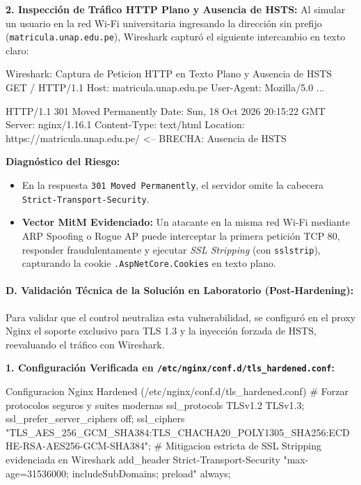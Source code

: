 \textbf{2. Inspección de Tráfico HTTP Plano y Ausencia de HSTS:} Al simular un usuario en la red Wi-Fi universitaria ingresando la dirección sin prefijo (\texttt{matricula.unap.edu.pe}), Wireshark capturó el siguiente intercambio en texto claro:

\begin{cmdbox}{Wireshark: Captura de Peticion HTTP en Texto Plano y Ausencia de HSTS}
GET / HTTP/1.1
Host: matricula.unap.edu.pe
User-Agent: Mozilla/5.0 ...

HTTP/1.1 301 Moved Permanently
Date: Sun, 18 Oct 2026 20:15:22 GMT
Server: nginx/1.16.1
Content-Type: text/html
Location: https://matricula.unap.edu.pe/
                                                         <-- BRECHA: Ausencia de HSTS
\end{cmdbox}

\textbf{Diagnóstico del Riesgo:}
\begin{itemize}
    \item En la respuesta \texttt{301 Moved Permanently}, el servidor omite la cabecera \texttt{Strict-Transport-Security}.
    \item \textbf{Vector MitM Evidenciado:} Un atacante en la misma red Wi-Fi mediante ARP Spoofing o Rogue AP puede interceptar la primera petición TCP 80, responder fraudulentamente y ejecutar \textit{SSL Stripping} (con \texttt{sslstrip}), capturando la cookie \texttt{.AspNetCore.Cookies} en texto plano.
\end{itemize}

\newpage
\paragraph{D. Validación Técnica de la Solución en Laboratorio (Post-Hardening):} Para validar que el control neutraliza esta vulnerabilidad, se configuró en el proxy Nginx el soporte exclusivo para TLS 1.3 y la inyección forzada de HSTS, reevaluando el tráfico con Wireshark.

\textbf{1. Configuración Verificada en \texttt{/etc/nginx/conf.d/tls\_hardened.conf}:}

\begin{cmdbox}{Configuracion Nginx Hardened (/etc/nginx/conf.d/tls\_hardened.conf)}
# Forzar protocolos seguros y suites modernas
ssl_protocols TLSv1.2 TLSv1.3;
ssl_prefer_server_ciphers off;
ssl_ciphers "TLS_AES_256_GCM_SHA384:TLS_CHACHA20_POLY1305_SHA256:ECDHE-RSA-AES256-GCM-SHA384";
# Mitigacion estricta de SSL Stripping evidenciada en Wireshark
add_header Strict-Transport-Security "max-age=31536000; includeSubDomains; preload" always;
\end{cmdbox}

